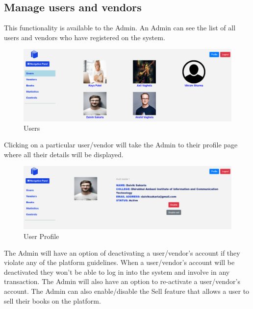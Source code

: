 \documentclass[conference]{IEEEtran}
\begin{document}
\subsection{Manage users and vendors}
This functionality is available to the Admin. An Admin can see the list of all users and vendors who have registered on the system.
\begin{figure}[h]
     \centering
     \includegraphics[scale=0.20,margin=2,frame]{users.PNG}
     \caption{Users}
     \label{fig:users}
 \end{figure}
Clicking on a particular user/vendor will take the Admin to their profile page where all their details will be displayed. 
\begin{figure}[h]
     \centering
     \includegraphics[scale=0.20,margin=2,frame]{Userprofile.PNG}
     \caption{User Profile}
     \label{fig:userprofile}
 \end{figure}
The Admin will have an option of deactivating a user/vendor's account if they violate any of the platform guidelines. When a user/vendor's account will be deactivated they won't be able to log in into the system and involve in any transaction. The Admin will also have an option to re-activate a user/vendor's account. The Admin can also enable/disable the Sell feature that allows a user to sell their books on the platform.
\end{document}
